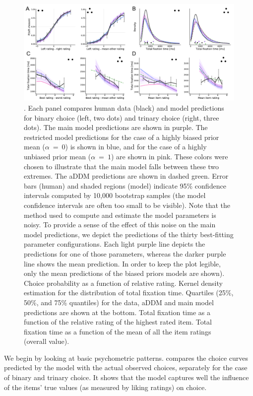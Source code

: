 \begin{figure}[t!]
  \centering
  \includegraphics[width=\textwidth]{figs/attention/Fig3.pdf}
  \caption{.
  Each panel compares human data (black) and model predictions for binary choice (left, two dots) and trinary choice (right, three dots). The main model predictions are shown in purple. The restricted model predictions for the case of a highly biased prior mean ($\alpha~=~0$) is shown in blue, and for the case of a highly unbiased prior mean ($\alpha~=~1$) are shown in pink. These colors were chosen to illustrate that the main model falls between these two extremes. The aDDM predictions are shown in dashed green. Error bars (human) and shaded regions (model) indicate 95\% confidence intervals computed by 10,000 bootstrap samples (the model confidence intervals are often too small to be visible). Note that the method used to compute and estimate the model parameters is noisy. To provide a sense of the effect of this noise on the main model predictions, we depict the predictions of the thirty best-fitting parameter configurations. Each light purple line depicts the predictions for one of those parameters, whereas the darker purple line shows the mean prediction. In order to keep the plot legible, only the mean predictions of the biased priors models are shown). 
   Choice probability as a function of relative rating.
   Kernel density estimation for the distribution of total fixation time. Quartiles (25\%, 50\%, and 75\% quantiles) for the data, aDDM and main model predictions are shown at the bottom.
   Total fixation time as a function of the relative rating of the highest rated item.
   Total fixation time as a function of the mean of all the item ratings (overall value).
  }
  \label{fig:attention3}
\end{figure}


 
We begin by looking at basic psychometric patterns.  compares the choice curves predicted by the model with the actual observed choices, separately for the case of binary and trinary choice. It shows that the model captures well the influence of the items' true values (as measured by liking ratings) on choice. 

